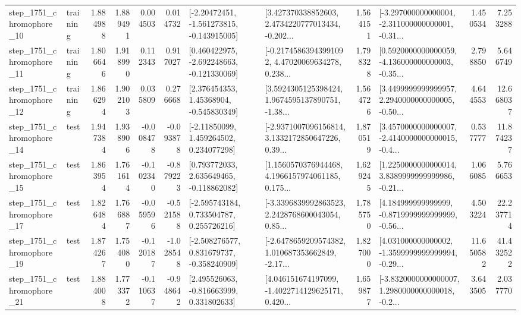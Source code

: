\begin{tabular}{llrrrrllrlrr}
 step\_1751\_chromophore\_10 &  training &      1.884988 &    1.889491 &      0.004503 &  0.014732 &   [-2.20472451, -1.561273815, -0.143915005] &  [3.427370338852603, 2.4734220777013434, -0.202... &       1.564151 &  [-3.297000000000004, -2.311000000000001, -0.31... &            1.450534 &          7.253288 \\
 step\_1751\_chromophore\_11 &  training &      1.806646 &    1.918990 &      0.112343 &  0.917027 &   [0.460422975, -2.692248663, -0.121330069] &  [-0.21745863943991092, 4.47020069634278, 0.238... &       1.798328 &  [0.5920000000000059, -4.136000000000003, -0.35... &            2.798850 &          5.646749 \\
 step\_1751\_chromophore\_12 &  training &      1.866294 &    1.902103 &      0.035809 &  0.276668 &     [2.376454353, 1.45368904, -0.545830349] &  [3.5924305125398424, 1.9674595137890751, -1.38... &       1.564726 &  [3.4499999999999957, 2.2940000000000005, -0.50... &            4.644553 &         12.668037 \\
 step\_1751\_chromophore\_14 &      test &      1.947384 &    1.938906 &     -0.008478 & -0.093878 &     [-2.11850099, 1.459264502, 0.234077298] &  [-2.9371007096156814, 3.1332172850647226, 0.39... &       1.870519 &  [3.4570000000000007, -2.4140000000000015, -0.4... &            0.537777 &         11.874237 \\
 step\_1751\_chromophore\_15 &      test &      1.863954 &    1.761614 &     -0.102340 & -0.879223 &    [0.793772033, 2.635649465, -0.118862082] &  [1.1560570376944468, 4.1966157974061185, 0.175... &       1.629245 &  [1.2250000000000014, 3.8389999999999986, -0.21... &            1.066085 &          5.766653 \\
 step\_1751\_chromophore\_17 &      test &      1.826484 &    1.766887 &     -0.059596 & -0.521588 &    [-2.595743184, 0.733504787, 0.255726216] &  [-3.3396839992863523, 2.2428768600043054, 0.85... &       1.785750 &  [4.184999999999999, -0.8719999999999999, -0.56... &            4.503224 &         22.237714 \\
 step\_1751\_chromophore\_19 &      test &      1.874267 &    1.754080 &     -0.120187 & -1.028548 &   [-2.508276577, 0.831679737, -0.358240909] &  [-2.6478659209574382, 1.010687353662849, -2.17... &       1.827000 &  [4.031000000000002, -1.3599999999999994, -0.29... &           11.650582 &         41.432522 \\
 step\_1751\_chromophore\_21 &      test &      1.884008 &    1.773372 &     -0.110637 & -0.948642 &    [2.495526063, -0.816663999, 0.331802633] &  [4.046151674197099, -1.4022714129625171, 0.420... &       1.659877 &  [-3.8320000000000007, 1.2980000000000018, -0.2... &            3.643505 &          2.037770 \\

\end{tabular}
